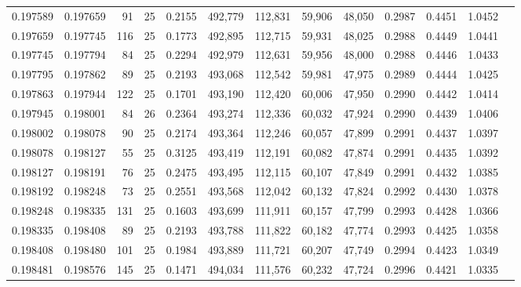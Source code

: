 \begin{tabular}{rrrrrrrrrrrrr}
0.197589 & 0.197659 &    91 &  25 &                                     0.2155 & 492,779 & 112,831 &  59,906 &  48,050 & 0.2987 & 0.4451 & 1.0452 \\
0.197659 & 0.197745 &   116 &  25 &                                     0.1773 & 492,895 & 112,715 &  59,931 &  48,025 & 0.2988 & 0.4449 & 1.0441 \\
0.197745 & 0.197794 &    84 &  25 &                                     0.2294 & 492,979 & 112,631 &  59,956 &  48,000 & 0.2988 & 0.4446 & 1.0433 \\
0.197795 & 0.197862 &    89 &  25 &                                     0.2193 & 493,068 & 112,542 &  59,981 &  47,975 & 0.2989 & 0.4444 & 1.0425 \\
0.197863 & 0.197944 &   122 &  25 &                                     0.1701 & 493,190 & 112,420 &  60,006 &  47,950 & 0.2990 & 0.4442 & 1.0414 \\
0.197945 & 0.198001 &    84 &  26 &                                     0.2364 & 493,274 & 112,336 &  60,032 &  47,924 & 0.2990 & 0.4439 & 1.0406 \\
0.198002 & 0.198078 &    90 &  25 &                                     0.2174 & 493,364 & 112,246 &  60,057 &  47,899 & 0.2991 & 0.4437 & 1.0397 \\
0.198078 & 0.198127 &    55 &  25 &                                     0.3125 & 493,419 & 112,191 &  60,082 &  47,874 & 0.2991 & 0.4435 & 1.0392 \\
0.198127 & 0.198191 &    76 &  25 &                                     0.2475 & 493,495 & 112,115 &  60,107 &  47,849 & 0.2991 & 0.4432 & 1.0385 \\
0.198192 & 0.198248 &    73 &  25 &                                     0.2551 & 493,568 & 112,042 &  60,132 &  47,824 & 0.2992 & 0.4430 & 1.0378 \\
0.198248 & 0.198335 &   131 &  25 &                                     0.1603 & 493,699 & 111,911 &  60,157 &  47,799 & 0.2993 & 0.4428 & 1.0366 \\
0.198335 & 0.198408 &    89 &  25 &                                     0.2193 & 493,788 & 111,822 &  60,182 &  47,774 & 0.2993 & 0.4425 & 1.0358 \\
0.198408 & 0.198480 &   101 &  25 &                                     0.1984 & 493,889 & 111,721 &  60,207 &  47,749 & 0.2994 & 0.4423 & 1.0349 \\
0.198481 & 0.198576 &   145 &  25 &                                     0.1471 & 494,034 & 111,576 &  60,232 &  47,724 & 0.2996 & 0.4421 & 1.0335 \\

\end{tabular}
